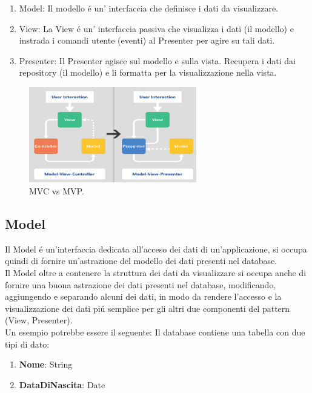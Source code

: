 \begin{enumerate}
\item Model: Il modello \'e un' interfaccia che definisce i dati da visualizzare.
\item View: La View \'e un' interfaccia passiva che visualizza i dati (il modello) e instrada i comandi utente (eventi) al Presenter per agire su tali dati.
\item Presenter: Il Presenter agisce sul modello e sulla vista. Recupera i dati dai repository (il modello) e li formatta per la visualizzazione nella vista.
\end{enumerate}

\begin{figure}[!h]
  \centering
  \includegraphics[width=0.65\textwidth]{immagini/mvc-vs-mvp.jpg}
  \caption{MVC vs MVP.}\label{fig:MVC vs MVP}
\end{figure}

\newpage


\subsection{Model}
Il Model \'e un'interfaccia dedicata all'acceso dei dati di un'applicazione, si occupa quindi di fornire un'astrazione del modello dei dati presenti nel database.\\
Il Model oltre a contenere la struttura dei dati da visualizzare si occupa anche di fornire una buona astrazione dei dati presenti nel database, modificando, aggiungendo e separando alcuni dei dati, in modo da rendere l'accesso e la visualizzazione dei dati pi\'u semplice per gli altri due componenti del pattern (View, Presenter).\\
Un esempio potrebbe essere il seguente:
Il database contiene una tabella con due tipi di dato:

\begin{enumerate}
\item \textbf{Nome}: String
\item \textbf{DataDiNascita}: Date
\end{enumerate}

